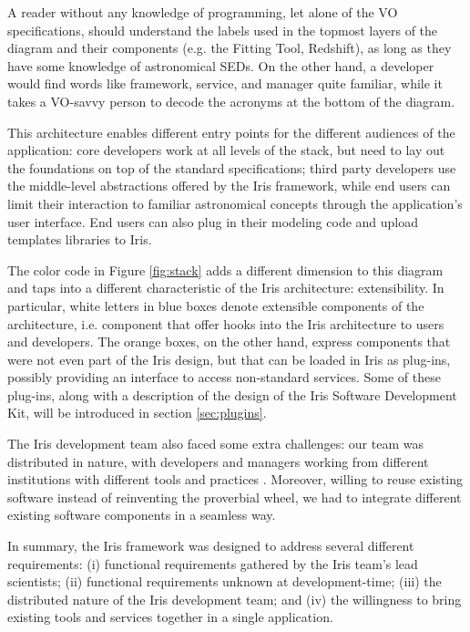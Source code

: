 \documentclass[final,5p,authoryear]{elsarticle}
\begin{document}
A reader without any knowledge of programming, let alone of the VO
specifications, should understand the labels used in the topmost layers of the
diagram and their components (e.g. the Fitting Tool, Redshift), as long as they
have some knowledge of astronomical SEDs. On the other hand, a developer would
find words like framework, service, and manager quite familiar, while it takes a
VO-savvy person to decode the acronyms at the bottom of the diagram.


This architecture enables different entry points for the different audiences of the
application: core developers work at all levels of the stack, but need to lay
out the foundations on top of the standard specifications; third party
developers use the middle-level abstractions offered by the Iris framework,
while end users can limit their interaction to familiar astronomical concepts
through the application's user interface. End users can also plug in their
modeling code and upload templates libraries to Iris.

The color code in Figure \ref{fig:stack} adds a different dimension to this
diagram and taps into a different characteristic of the Iris architecture:
extensibility. In particular, white letters in blue boxes denote extensible
components of the architecture, i.e. component that offer hooks into the Iris
architecture to users and developers. The orange boxes, on the other hand,
express components that were not even part of the Iris design, but that can be
loaded in Iris as plug-ins, possibly providing an interface to access
non-standard services. Some of these plug-ins, along with a description of the
design of the Iris Software Development Kit, will be introduced in section
\ref{sec:plugins}.

The Iris development team also faced some extra challenges: our team was
distributed in nature, with developers and managers working from different
institutions with different tools and practices \citep{2012SPIE.8449E..0IE}.
Moreover, willing to reuse existing software instead of reinventing the
proverbial wheel, we had to integrate different existing software components in
a seamless way.

In summary, the Iris framework was designed to address several different
requirements: (i) functional requirements gathered by the Iris team's lead
scientists; (ii) functional requirements unknown at development-time; (iii) the
distributed nature of the Iris development team; and (iv) the willingness to
bring existing tools and services together in a single application.
\end{document}
